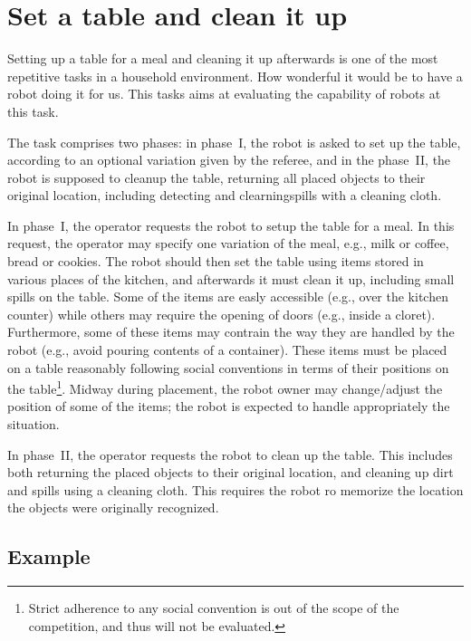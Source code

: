 \section{Set a table and clean it up}

Setting up a table for a meal and cleaning it up afterwards is one of the most repetitive tasks in a household environment. How wonderful it would be to have a robot doing it for us. This tasks aims at evaluating the capability of robots at this task.

The task comprises two phases: in phase~I, the robot is asked to set up the table, according to an optional variation given by the referee, and in the phase~II, the robot is supposed to cleanup the table, returning all placed objects to their original location, including detecting and clearningspills with a cleaning cloth.

In phase~I, the operator requests the robot to setup the table for a meal. In this request, the operator may specify one variation of the meal, e.g., milk or coffee, bread or cookies. The robot should then set the table using items stored in various places of the kitchen, and afterwards it must clean it up, including small spills on the table. Some of the items are easly accessible (e.g., over the kitchen counter) while others may require the opening of doors (e.g., inside a cloret). Furthermore, some of these items may contrain the way they are handled by the robot (e.g., avoid pouring contents of a container). These items must be placed on a table reasonably following social conventions in terms of their positions on the table\footnote{Strict adherence to any social convention is out of the scope of the competition, and thus will not be evaluated.}. Midway during placement, the robot owner may change/adjust the position of some of the items; the robot is expected to handle appropriately the situation.

In phase~II, the operator requests the robot to clean up the table. This includes both returning the placed objects to their original location, and cleaning up dirt and spills using a cleaning cloth. This requires the robot ro memorize the location the objects were originally recognized.


\subsection{Example}

